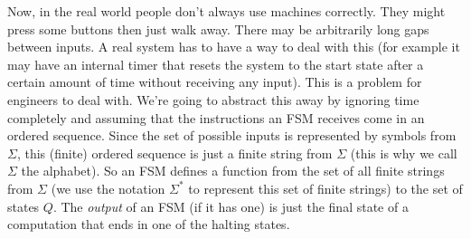 \documentclass{article}
\theoremstyle{plain}
\begin{document}
Now, in the real world people don't always use machines correctly. They might press some buttons then just walk away. There may be arbitrarily long gaps between inputs. A real system has to have a way to deal with this (for example it may have an internal timer that resets the system to the start state after a certain amount of time without receiving any input). This is a problem for engineers to deal with. We're going to abstract this away by ignoring time completely and assuming that the instructions an FSM receives come in an ordered sequence. Since the set of possible inputs is represented by symbols from $\Sigma$, this (finite) ordered sequence is just a finite string from $\Sigma$ (this is why we call $\Sigma$ the alphabet). So an FSM defines a function from the set of all finite strings from $\Sigma$ (we use the notation $\Sigma^*$ to represent this set of finite strings) to the set of states $Q$. The \emph{output} of an FSM (if it has one) is just the final state of a computation that ends in one of the halting states.
\end{document}
